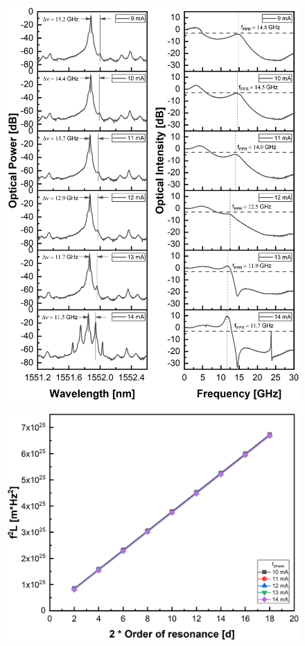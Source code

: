 \begin{figure}[!htb]
    \centering
    \includegraphics[width=\linewidth]{figures/spectra_and_bandwidth_6559.png}
    \caption{}
    \label{fig:spectra_and_bandwidth_6559}
\end{figure}

\begin{figure}[!htb]
    \centering
    \includegraphics[width=.7\linewidth]{figures/chirp_6559.png}
    \caption{}
    \label{fig:chirp_6559}
\end{figure}

